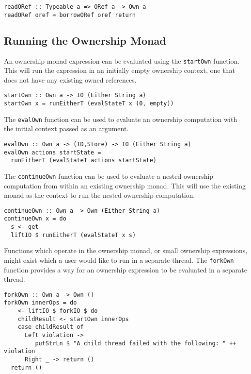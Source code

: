 \documentclass[onehalf,11pt]{beavtex}
\begin{document}
\begin{verbatim}
readORef :: Typeable a => ORef a -> Own a
readORef oref = borrowORef oref return
\end{verbatim}


\subsection{Running the Ownership Monad}

An ownership monad expression can be evaluated using the \texttt{startOwn}
function. This will run the expression in an initially empty ownership context,
one that does not have any existing owned references. 

\begin{verbatim}
startOwn :: Own a -> IO (Either String a)
startOwn x = runEitherT (evalStateT x (0, empty))
\end{verbatim}

The \texttt{evalOwn} function can be used to evaluate an ownership computation
with the initial context passed as an argument.

\begin{verbatim}
evalOwn :: Own a -> (ID,Store) -> IO (Either String a)
evalOwn actions startState =
  runEitherT (evalStateT actions startState)
\end{verbatim}

The \texttt{continueOwn} function can be used to evaluate a nested ownership
computation from within an existing ownership monad.  This will use the
existing monad as the context to run the nested ownership computation. 

\begin{verbatim}
continueOwn :: Own a -> Own (Either String a)
continueOwn x = do
  s <- get
  liftIO $ runEitherT (evalStateT x s)
\end{verbatim}

Functions which operate in the ownership monad, or small ownership expressions,
might exist which a user would like to run in a separate thread.
The \texttt{forkOwn} function provides a way for an ownership expression to be
evaluated in a separate thread.

\begin{verbatim}
forkOwn :: Own a -> Own ()
forkOwn innerOps = do
  _ <- liftIO $ forkIO $ do
    childResult <- startOwn innerOps
    case childResult of
      Left violation -> 
         putStrLn $ "A child thread failed with the following: " ++ violation
      Right _ -> return ()
  return ()
\end{verbatim}
\end{document}
